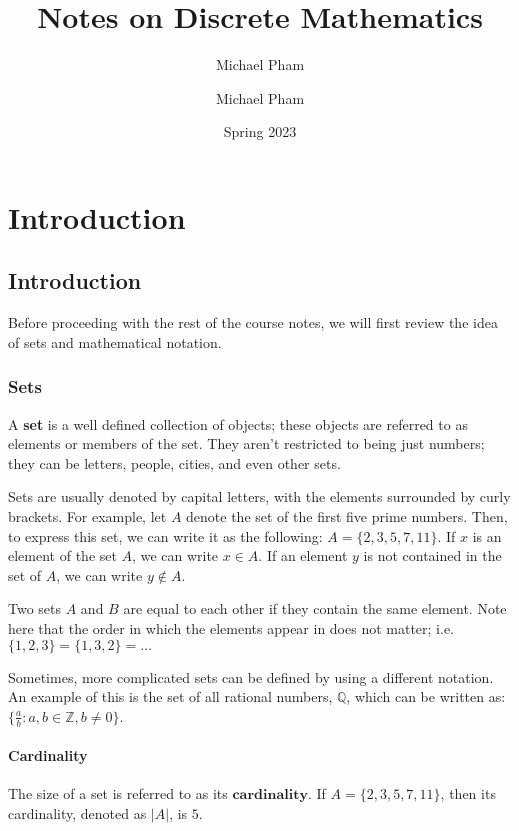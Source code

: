 \documentclass[openany]{book}
\title{#1}
\author{Michael Pham}
\date{#2}
\makeatletter
\newcommand\mytoc{%
	\if@twocolumn
	\@restonecoltrue\onecolumn
	\else
	\@restonecolfalse
	\fi
	\toctrue
	\chapter*{\contentsname
		\@mkboth{%
			\contentsname}{\contentsname}}\addcontentsline{toc}{chapter}{Contents}%
	\tocfalse
	\@starttoc{toc}%
	\if@restonecol\twocolumn\fi
}
\newif\iftoc
\newcommand{\mytitle}[2]{%
	\title{#1}
	\author{Michael Pham}
	\date{#2}
	\maketitle
	\newpage
	\mytoc
	\newpage
}
\makeatother
\begin{document}
\mytitle{Notes on Discrete Mathematics}{Spring 2023}
\setcounter{chapter}{-1}
\chapter{Introduction}
\section{Introduction}

Before proceeding with the rest of the course notes, we will first review the idea of sets and mathematical notation. 

\subsection{Sets} 
\begin{defn}[Set]
	A \textbf{set} is a well defined collection of objects; these objects are referred to as elements or members of the set. They aren't restricted to being just numbers; they can be letters, people, cities, and even other sets.
\end{defn}

Sets are usually denoted by capital letters, with the elements surrounded by curly brackets. For example, let $A$ denote the set of the first five prime numbers. Then, to express this set, we can write it as the following: $A=\{2,3,5,7,11\}$. If $x$ is an element of the set $A$, we can write $x\in A$. If an element $y$ is not contained in the set of $A$, we can write $y \notin A$.

Two sets $A$ and $B$ are equal to each other if they contain the same element. Note here that the order in which the elements appear in does not matter; i.e. $\{1,2,3\}=\{1,3,2\}=\ldots$

Sometimes, more complicated sets can be defined by using a different notation. An example of this is the set of all rational numbers, $\mathbb{Q}$, which can be written as: $\{\frac{a}{b}:a,b\in\mathbb{Z}, b\neq0\}$.

\subsubsection{Cardinality} 
\begin{defn}[Cardinality]
	The size of a set is referred to as its $\textbf{cardinality}$. If $A=\{2,3,5,7,11\}$, then its cardinality, denoted as $\lvert A\rvert$, is $5$.
\end{defn}
\end{document}
